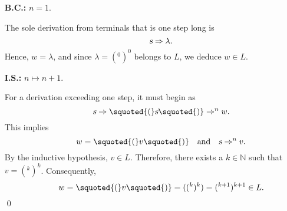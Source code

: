 \begin{enumerate}
\item[\textbf{B.C.:}] \( n = 1 \).

            The sole derivation from terminals that is one step long is
            \[
            \hspace*{1.3cm}
            \textsl{s} \Rightarrow \lambda.
            \]
            Hence, \( w = \lambda \), and since \( \lambda = (^0)^0 \) belongs to \( L \), we deduce \( w \in L \).

\item[\textbf{I.S.:}] \( n \mapsto n+1 \).

            For a derivation exceeding one step, it must begin as
            \[
            \hspace*{1.3cm}
            \textsl{s} \Rightarrow \squoted{(} \textsl{s} \squoted{)} \Rightarrow^n w.
            \]
            This implies
            \[
            \hspace*{1.3cm}
            w = \squoted{(}v\squoted{)} \quad \text{and} \quad \textsl{s} \Rightarrow^n v.
            \]
            By the inductive hypothesis, \( v \in L \). Therefore, there exists a \( k \in \mathbb{N} \) such that \( v = (^k)^k \).
            Consequently,
            \[
            \hspace*{1.3cm}
            w = \squoted{(}v\squoted{)} = ((^k)^k) = (^{k+1})^{k+1} \in L. 
            \] \qed
\end{enumerate}

